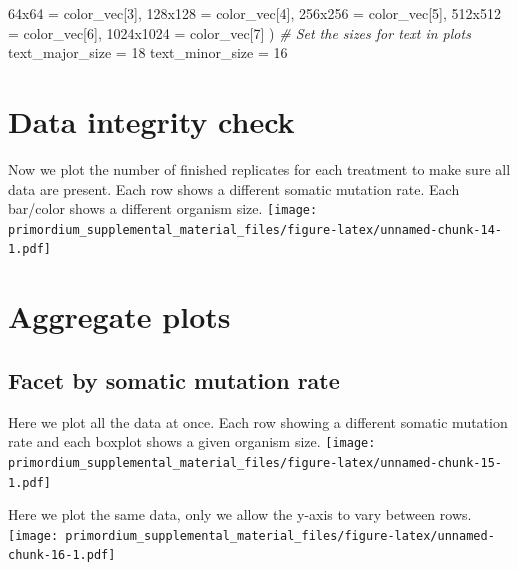 \documentclass[
]{book}
\newenvironment{Shaded}{\begin{snugshade}}{\end{snugshade}}
\newcommand{\CommentTok}[1]{\textcolor[rgb]{0.56,0.35,0.01}{\textit{#1}}}
\newcommand{\DecValTok}[1]{\textcolor[rgb]{0.00,0.00,0.81}{#1}}
\newcommand{\NormalTok}[1]{#1}
\newcommand{\StringTok}[1]{\textcolor[rgb]{0.31,0.60,0.02}{#1}}
\begin{document}
\begin{Shaded}
\begin{Highlighting}[]
  \StringTok{\textquotesingle{}64x64\textquotesingle{}}\NormalTok{ =}\StringTok{     }\NormalTok{color\_vec[}\DecValTok{3}\NormalTok{],}
  \StringTok{\textquotesingle{}128x128\textquotesingle{}}\NormalTok{ =}\StringTok{   }\NormalTok{color\_vec[}\DecValTok{4}\NormalTok{],}
  \StringTok{\textquotesingle{}256x256\textquotesingle{}}\NormalTok{ =}\StringTok{   }\NormalTok{color\_vec[}\DecValTok{5}\NormalTok{],}
  \StringTok{\textquotesingle{}512x512\textquotesingle{}}\NormalTok{ =}\StringTok{   }\NormalTok{color\_vec[}\DecValTok{6}\NormalTok{],}
  \StringTok{\textquotesingle{}1024x1024\textquotesingle{}}\NormalTok{ =}\StringTok{ }\NormalTok{color\_vec[}\DecValTok{7}\NormalTok{]}
\NormalTok{)}
\CommentTok{\# Set the sizes for text in plots}
\NormalTok{text\_major\_size =}\StringTok{ }\DecValTok{18}
\NormalTok{text\_minor\_size =}\StringTok{ }\DecValTok{16} 
\end{Highlighting}
\end{Shaded}

\hypertarget{data-integrity-check-1}{%
\section{Data integrity check}\label{data-integrity-check-1}}

Now we plot the number of finished replicates for each treatment to make sure all data are present.
Each row shows a different somatic mutation rate.
Each bar/color shows a different organism size.
\texttt{[image: primordium\_supplemental\_material\_files/figure-latex/unnamed-chunk-14-1.pdf]}

\hypertarget{aggregate-plots-1}{%
\section{Aggregate plots}\label{aggregate-plots-1}}

\hypertarget{facet-by-somatic-mutation-rate}{%
\subsection{Facet by somatic mutation rate}\label{facet-by-somatic-mutation-rate}}

Here we plot all the data at once.
Each row showing a different somatic mutation rate and each boxplot shows a given organism size.
\texttt{[image: primordium\_supplemental\_material\_files/figure-latex/unnamed-chunk-15-1.pdf]}

Here we plot the same data, only we allow the y-axis to vary between rows.
\texttt{[image: primordium\_supplemental\_material\_files/figure-latex/unnamed-chunk-16-1.pdf]}
\end{document}
